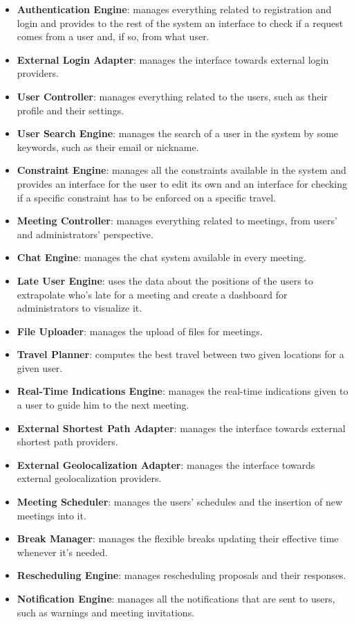 \begin{itemize}
\item \textbf{Authentication Engine}: manages everything related to registration and login and provides to the rest of the system an interface to check if a request comes from a user and, if so, from what user.
\item \textbf{External Login Adapter}: manages the interface towards external login providers.
\item \textbf{User Controller}: manages everything related to the users, such as their profile and their settings.
\item \textbf{User Search Engine}: manages the search of a user in the system by some keywords, such as their email or nickname.
\item \textbf{Constraint Engine}: manages all the constraints available in the system and provides an interface for the user to edit its own and an interface for checking if a specific constraint has to be enforced on a specific travel.
\item \textbf{Meeting Controller}: manages everything related to meetings, from users' and administrators' perspective.
\item \textbf{Chat Engine}: manages the chat system available in every meeting.
\item \textbf{Late User Engine}: uses the data about the positions of the users to extrapolate who's late for a meeting and create a dashboard for administrators to visualize it.
\item \textbf{File Uploader}: manages the upload of files for meetings.
\item \textbf{Travel Planner}: computes the best travel between two given locations for a given user.
\item \textbf{Real-Time Indications Engine}: manages the real-time indications given to a user to guide him to the next meeting.
\item \textbf{External Shortest Path Adapter}: manages the interface towards external shortest path providers.
\item \textbf{External Geolocalization Adapter}: manages the interface towards external geolocalization providers.
\item \textbf{Meeting Scheduler}: manages the users' schedules and the insertion of new meetings into it.
\item \textbf{Break Manager}: manages the flexible breaks updating their effective time whenever it's needed.
\item \textbf{Rescheduling Engine}: manages rescheduling proposals and their responses.
\item \textbf{Notification Engine}: manages all the notifications that are sent to users, such as warnings and meeting invitations.
\end{itemize}